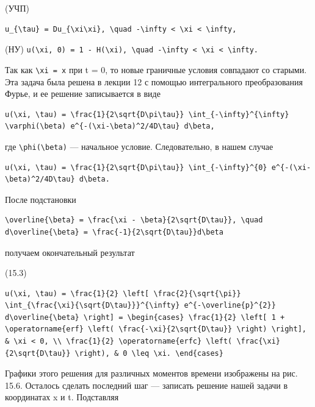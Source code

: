 \documentclass[
  ukrainian,
]{article}
\begin{document}
(УЧП)

\begin{verbatim}
u_{\tau} = Du_{\xi\xi}, \quad -\infty < \xi < \infty,
\end{verbatim}

(НУ)
\texttt{u(\textbackslash{}xi,\ 0)\ =\ 1\ -\ H(\textbackslash{}xi),\ \textbackslash{}quad\ -\textbackslash{}infty\ \textless{}\ \textbackslash{}xi\ \textless{}\ \textbackslash{}infty.}

Так как \texttt{\textbackslash{}xi\ =\ x} при t = 0, то новые граничные
условия совпадают со старыми. Эта задача была решена в лекции 12 с
помощью интегрального преобразования Фурье, и ее решение записывается в
виде

\begin{verbatim}
u(\xi, \tau) = \frac{1}{2\sqrt{D\pi\tau}} \int_{-\infty}^{\infty} \varphi(\beta) e^{-(\xi-\beta)^2/4D\tau} d\beta,
\end{verbatim}

где \texttt{\textbackslash{}phi(\textbackslash{}beta)} --- начальное
условие. Следовательно, в нашем случае

\begin{verbatim}
u(\xi, \tau) = \frac{1}{2\sqrt{D\pi\tau}} \int_{-\infty}^{0} e^{-(\xi-\beta)^2/4D\tau} d\beta.
\end{verbatim}

После подстановки

\begin{verbatim}
\overline{\beta} = \frac{\xi - \beta}{2\sqrt{D\tau}}, \quad d\overline{\beta} = \frac{-1}{2\sqrt{D\tau}}d\beta
\end{verbatim}

получаем окончательный результат

(15.3)

\begin{verbatim}
u(\xi, \tau) = \frac{1}{2} \left[ \frac{2}{\sqrt{\pi}} \int_{\frac{\xi}{\sqrt{D\tau}}}^{\infty} e^{-\overline{p}^{2}} d\overline{\beta} \right] = \begin{cases} \frac{1}{2} \left[ 1 + \operatorname{erf} \left( \frac{-\xi}{2\sqrt{D\tau}} \right) \right], & \xi < 0, \\ \frac{1}{2} \operatorname{erfc} \left( \frac{\xi}{2\sqrt{D\tau}} \right), & 0 \leq \xi. \end{cases}
\end{verbatim}

Графики этого решения для различных моментов времени изображены на рис.
15.6. Осталось сделать последний шаг --- записать решение нашей задачи в
координатах x и t. Подставляя
\end{document}
